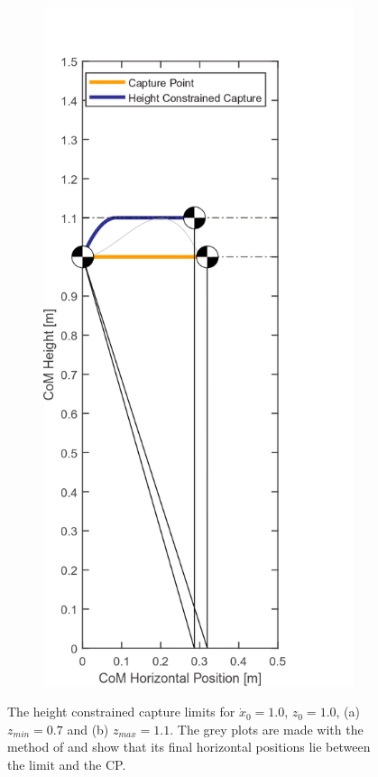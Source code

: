 \begin{figure}[h]
\begin{subfigure}{0.45\textwidth}
  \caption{}
   \label{fig:cpzmin}
  \end{subfigure}
  \begin{subfigure}{0.45\textwidth}
  \centering
  \includegraphics[width=.8\linewidth]{STYLESTUFF/CPvsHeight.png}
   \caption{}
    \label{fig:cpzmax}
  \end{subfigure}
  \caption{The height constrained capture limits for $\dot{x}_0=1.0$, $z_0=1.0$, (a) $z_{min}=0.7$ and (b) $z_{max}=1.1$. The grey plots are made with the method of \cite{koolen2016balance} and show that its final horizontal positions lie between the limit and the \ac{CP}. }
  \label{fig:cpz}
\end{figure}

